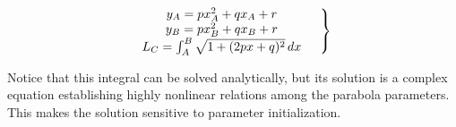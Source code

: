
\begin{equation}
    \label{eq:parabola_2}
    \left.
        \begin{array}{cc}
            y_A = p{x_A^2} + qx_A + r & \\
            y_B = p{x_B^2} + qx_B + r & \\
            \vphantom{\int_{A}^{B}} L_C=\int_{A}^{B}\sqrt{1+(2px+q)^2}\,dx
        \end{array}
        \right\}
\end{equation}




\noindent Notice that this integral can be solved analytically, but its solution is a complex equation establishing highly nonlinear relations among the parabola parameters. This makes the solution sensitive to parameter initialization.

